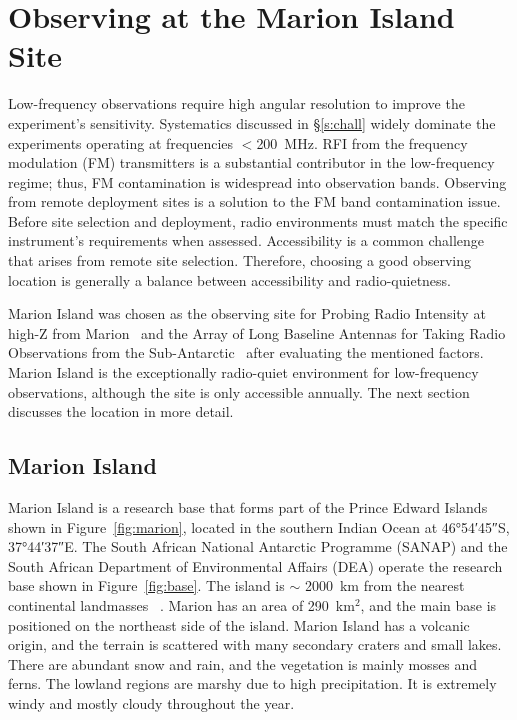 \chapter{Observing at the Marion Island Site}

Low-frequency observations require high angular resolution to improve the experiment's sensitivity. Systematics discussed in \S\ref{s:chall} widely dominate the experiments operating at frequencies $<$\SI{200}{MHz}. RFI from the frequency modulation (FM) transmitters is a substantial contributor in the low-frequency regime; thus, FM contamination is widespread into observation bands. Observing from remote deployment sites is a solution to the FM band contamination issue. Before site selection and deployment, radio environments must match the specific instrument's requirements when assessed. Accessibility is a common challenge that arises from remote site selection. Therefore, choosing a good observing location is generally a balance between	accessibility and radio-quietness. 

Marion Island was chosen as the observing site for Probing Radio Intensity at high-Z from Marion~\citep[\prizm;][]{2019JAI.....850004P} and the Array of Long Baseline Antennas for Taking Radio Observations from the Sub-Antarctic~\citep[\albatros;][]{2020arXiv200812208C} after evaluating the mentioned factors. Marion Island is the exceptionally radio-quiet environment for low-frequency observations, although the site is only accessible annually. The next section discusses the location in more detail.

\section{Marion Island}

Marion Island is a research base that forms part of the Prince Edward Islands shown in Figure~\ref{fig:marion}, located in the southern Indian Ocean at \ang{46;54;45}S, \ang{37;44;37}E. The South African National Antarctic Programme (SANAP) and the South African Department of Environmental Affairs (DEA) operate the research base shown in Figure~\ref{fig:base}. The island is $\sim$ \SI{2000}{\kilo\metre} from the nearest continental landmasses ~\citep{2019JAI.....850004P}. Marion has an area of 290~km$^2$, and the main base is positioned on the northeast side of the island. Marion Island has a volcanic origin, and the terrain is scattered with many secondary craters and small lakes. There are abundant snow and rain, and the vegetation is mainly mosses and ferns. The lowland regions are marshy due to high precipitation. It is extremely windy and	mostly cloudy throughout the year.

